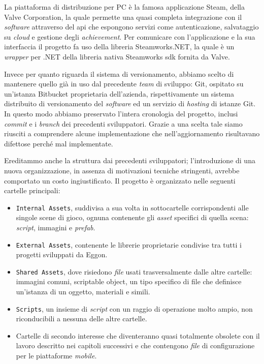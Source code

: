 La piattaforma di distribuzione per PC è la famosa applicazione Steam, della Valve Corporation, la quale permette una quasi completa integrazione con il \textit{software} attraverso del \gls{api} che espongono servizi come autenticazione, salvataggio su \textit{cloud} e gestione degli \textit{achievement}. Per comunicare con l'applicazione e la sua interfaccia il progetto fa uso della libreria Steamworks.NET, la quale è un \textit{wrapper} per .NET della libreria nativa Steamworks \gls{sdk} fornita da Valve.

Invece per quanto riguarda il sistema di versionamento, abbiamo scelto di mantenere quello già in uso dal precedente \textit{team} di sviluppo: Git, ospitato su un'istanza Bitbucket proprietaria dell'azienda, rispettivamente un sistema distribuito di versionamento del \textit{software} ed un servizio di \textit{hosting} di istanze Git. In questo modo abbiamo preservato l'intera cronologia del progetto, inclusi \textit{commit} e i \textit{branch} dei precedenti sviluppatori. Grazie a una scelta tale siamo riusciti a comprendere alcune implementazione che nell'aggiornamento risultavano difettose perché mal implementate.

Ereditammo anche la struttura dai precedenti sviluppatori; l'introduzione di una nuova organizzazione, in assenza di motivazioni tecniche stringenti, avrebbe 
comportato un costo ingiustificato.
Il progetto è organizzato nelle seguenti cartelle principali:

\begin{itemize}
    \item \texttt{Internal Assets}, suddivisa a sua volta in sottocartelle corrispondenti alle singole scene di gioco, ognuna contenente gli \textit{asset} specifici di quella scena: \textit{script}, immagini e \textit{prefab}.
    \item \texttt{External Assets}, contenente le librerie proprietarie condivise tra tutti i progetti sviluppati da Eggon.
    \item \texttt{Shared Assets}, dove risiedono \textit{file} usati trasversalmente dalle altre cartelle: immagini comuni, \gls{scriptable object}, un tipo specifico di file che definisce un'istanza di un oggetto, materiali e simili.
    \item \texttt{Scripts}, un insieme di \textit{script} con un raggio di operazione molto ampio, non riconducibili a nessuna delle altre cartelle.
    \item Cartelle di secondo interesse che diventeranno quasi totalmente obsolete con il lavoro descritto nei capitoli successivi e che contengono \textit{file} di configurazione per le piattaforme \textit{mobile}.
\end{itemize}

